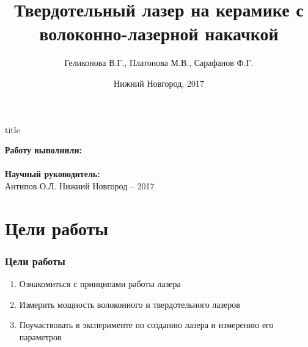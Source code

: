\documentclass[10pt,pdf,hyperref={unicode}, dvipsnames]{beamer}
\title[]{Твердотельный лазер на керамике с волоконно-лазерной накачкой}
\author{%
	Геликонова В.Г., %
	Платонова М.В., %
	Сарафанов Ф.Г. %
}
\institute{Радиофизический факультет ННГУ, 420 группа}
\date{Нижний Новгород, 2017}
\begin{document}
  

\begin{frame}[plain]
	\centering
	\vspace{2cm}
	\begin{beamercolorbox}[sep=8pt,center]{title}
		\bf{}\inserttitle
	\end{beamercolorbox}
	\vspace{0.5cm}
	\normalsize \textbf{Работу выполнили:}\\
	\large\insertauthor\\ 
	\vspace{0.5cm}
	\normalsize{\textbf{Научный руководитель:}\\}
	\large{Антипов О.Л.}
	\vfill
	\small{Нижний Новгород -- 2017}
\end{frame}
\section{Цели работы}
\begin{frame}[t]
	\frametitle{Цели работы}
	\begin{enumerate}
		\item Ознакомиться с принципами работы  лазера
		\item Измерить мощность волоконного и твердотельного лазеров
		\item Поучаствовать в эксперименте по созданию лазера и измерению его параметров	
	\end{enumerate}
\end{frame}
\end{document}
